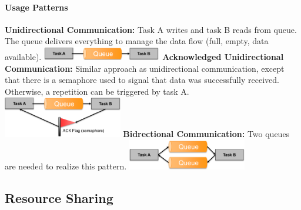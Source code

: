 \paragraph{Usage Patterns}
\begin{paracol}{2}
	\textbf{Unidirectional Communication:} Task A writes and task B reads from queue.
	The queue delivers everything to manage the data flow (full, empty, data available).
	\switchcolumn
	\includegraphics[width=0.39\textwidth]{images/Concurrency/uni_queue.png}
	\switchcolumn
	\textbf{Acknowledged Unidirectional Communication:}
	Similar approach as unidirectional communication, except that there is a semaphore used to signal that data was successfully received.
	Otherwise, a repetition can be triggered by task A.
	\switchcolumn
	\includegraphics[width=0.39\textwidth]{images/Concurrency/ack_queue.png}
	\switchcolumn
	\textbf{Bidrectional Communication:} Two queues are needed to realize this pattern.
	\switchcolumn
	\includegraphics[width=0.39\textwidth]{images/Concurrency/bi_queue.png}
\end{paracol}


\subsection{Resource Sharing}
